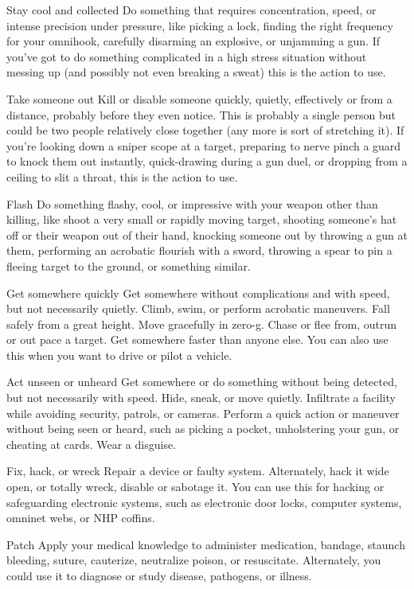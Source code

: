 Stay cool and collected
Do something that requires concentration, speed, or intense precision under pressure, like picking
a lock, finding the right frequency for your omnihook, carefully disarming an explosive, or
unjamming a gun. If you’ve got to do something complicated in a high stress situation without
messing up (and possibly not even breaking a sweat) this is the action to use.




Take someone out
Kill or disable someone quickly, quietly, effectively or from a distance, probably before they even
notice. This is probably a single person but could be two people relatively close together (any
more is sort of stretching it). If you’re looking down a sniper scope at a target, preparing to nerve
pinch a guard to knock them out instantly, quick-drawing during a gun duel, or dropping from a
ceiling to slit a throat, this is the action to use.

Flash
Do something flashy, cool, or impressive with your weapon other than killing, like shoot a very
small or rapidly moving target, shooting someone’s hat off or their weapon out of their hand,
knocking someone out by throwing a gun at them, performing an acrobatic flourish with a sword,
throwing a spear to pin a fleeing target to the ground, or something similar.

Get somewhere quickly
Get somewhere without complications and with speed, but not necessarily quietly. Climb, swim, or
perform acrobatic maneuvers. Fall safely from a great height. Move gracefully in zero-g. Chase or
flee from, outrun or out pace a target. Get somewhere faster than anyone else. You can also use
this when you want to drive or pilot a vehicle.

Act unseen or unheard
Get somewhere or do something without being detected, but not necessarily with speed. Hide,
sneak, or move quietly. Infiltrate a facility while avoiding security, patrols, or cameras. Perform a
quick action or maneuver without being seen or heard, such as picking a pocket, unholstering
your gun, or cheating at cards. Wear a disguise.

Fix, hack, or wreck
Repair a device or faulty system. Alternately, hack it wide open, or totally wreck, disable or
sabotage it. You can use this for hacking or safeguarding electronic systems, such as electronic
door locks, computer systems, omninet webs, or NHP coffins.

Patch
Apply your medical knowledge to administer medication, bandage, staunch bleeding, suture,
cauterize, neutralize poison, or resuscitate. Alternately, you could use it to diagnose or study
disease, pathogens, or illness.

